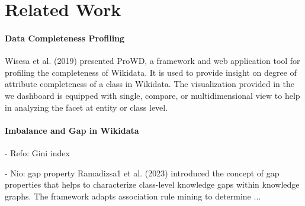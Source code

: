\section{Related Work}

\paragraph{Data Completeness Profiling} Wisesa et al. (2019) presented ProWD, a framework and web application tool for profiling the completeness of Wikidata. It is used to provide insight on degree of attribute completeness of a class in Wikidata. The visualization provided in the we dashboard is equipped with single, compare, or multidimensional view to help in analyzing the facet at entity or class level.

\paragraph{Imbalance and Gap in Wikidata}
- Refo: Gini index

- Nio: gap property
Ramadizsa1 et al. (2023) introduced the concept of gap properties that helps to characterize class-level knowledge gaps within knowledge graphs. The framework adapts association rule mining to determine ...